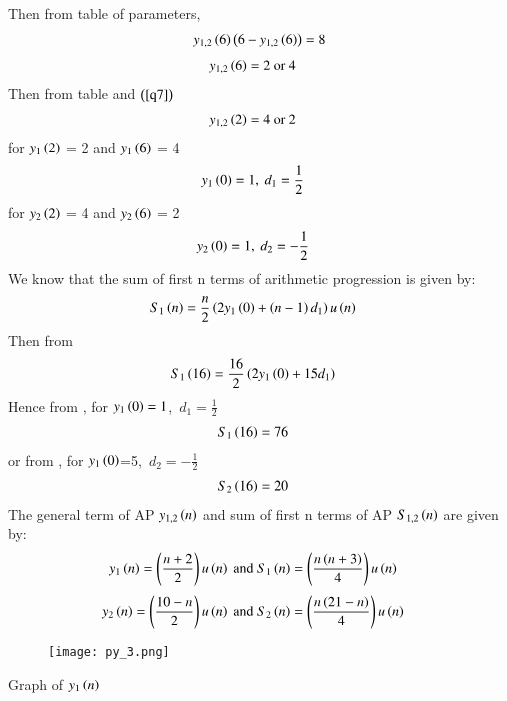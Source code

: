 \documentclass[beamer]{IEEEtran}
\theoremstyle{remark}
\begin{document}
Then from table of parameters,
\begin{align}
y_{1,2}\left(6\right)\left(6-y_{1,2}\left(6\right)\right)=8
\end{align}
\begin{align}
\label{q7}
    y_{1,2}\left(6\right)&=2\ \text{or}\ 4
\end{align}
Then from table and $\left(\ref{q7}\right)$
\begin{align}
\label{q8}
    y_{1,2}\left(2\right)&=4\ \text{or}\ 2
\end{align}
for $y_1\left(2\right)$ = 2 and $y_1\left(6\right)$ = 4
\begin{align}
y_1\left(0\right)&=1,\ d_1=\frac{1}{2}
\end{align}
for $y_2\left(2\right)$ = 4 and $y_2\left(6\right)$ = 2
\begin{align}
y_2\left(0\right)&=1,\ d_2=-\frac{1}{2}
\end{align}
We know that the sum of first n terms of arithmetic progression is given by:
\begin{align}
\label{q9}
S_1\left(n\right)&= \frac{n}{2}\left(2y_1\left(0\right)+\left(n-1\right)d_1\right)u\left(n\right)
\end{align}
Then from \brak{\ref{q9}}
\begin{align}
\label{q10}
S_1\left(16\right)&= \frac{16}{2}\left(2y_1\left(0\right)+15d_1\right)
\end{align}
Hence from \brak{\ref{q10}},
for $y_1\left(0\right)=1$,\ $d_1=\frac{1}{2}$
\begin{align}
\label{11}
S_1\left(16\right)&=76
\end{align}
or from \brak{\ref{q10}},
for $y_1\left(0\right)$=5,\ $d_2=-\frac{1}{2}$
\begin{align}
\label{12}
S_2\left(16\right)&=20
\end{align}
The general term of AP $y_{1,2}\left(n\right)$ and sum of first n terms of AP $S_{1,2}\left(n\right)$ are given by:
\begin{align}
y_1\brak{n}&=\brak{\frac{n+2}{2}}u\brak{n}\ \text{and}\ S_1\brak{n}=\brak{\frac{n\brak{n+3}}{4}}u\brak{n}
\end{align}
\begin{align}
y_2\brak{n}&=\brak{\frac{10-n}{2}}u\brak{n}\ \text{and}\ S_2\brak{n}=\brak{\frac{n\brak{21-n}}{4}}u\brak{n}
\end{align}

\begin{figure}[h]
    \centering
    \texttt{[image: py\_3.png]}
    \label{fig:x1n}
\end{figure}

\begin{center}
    Graph of $y_1\left(n\right)$
\end{center}
\end{document}
